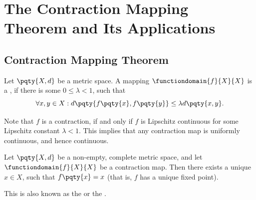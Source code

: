 \section{The Contraction Mapping Theorem and Its Applications}
\subsection{Contraction Mapping Theorem}

\begin{definition}
    Let \(\pqty{X, d}\) be a metric space. A mapping \(\functiondomain{f}{X}{X}\) is a , if there is some \(0 \leq \lambda < 1\), such that
    \[
        \forall x, y \in X: d\pqty{f\pqty{x}, f\pqty{y}} \leq \lambda d\pqty{x, y}.
    \]
\end{definition}

Note that \(f\) is a contraction, if and only if \(f\) is Lipschitz continuous for some Lipschitz constant \(\lambda < 1\). This implies that any contraction map is uniformly continuous, and hence continuous.

\begin{theorem}
    \label{thm:contraction-mapping}%
    Let \(\pqty{X, d}\) be a non-empty, complete metric space, and let \(\functiondomain{f}{X}{X}\) be a contraction map. Then there exists a unique \(x \in X\), such that \(f\pqty{x} = x\) (that is, \(f\) has a unique fixed point).
\end{theorem}

This is also known as the  or the .

